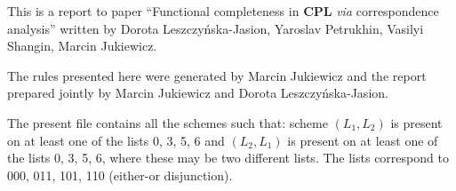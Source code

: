 \documentclass[11pt]{article}
\begin{document}
	
	This is a report to paper ``Functional completeness in \textbf{CPL} \textit{via} correspondence analysis'' written by Dorota Leszczy\'{n}ska-Jasion, 
	Yaroslav Petrukhin, Vasilyi Shangin, Marcin Jukiewicz. 
	
	The rules presented here were generated by Marcin Jukiewicz and the report prepared jointly by Marcin Jukiewicz and Dorota Leszczy\'{n}ska-Jasion.
	
	The present file contains all the schemes such that: scheme $(L_1, L_2)$ is present on at least one of the lists 0, 3, 5, 6 and $(L_2, L_1)$ is present on at least one of the lists 0, 3, 5, 6, where these may be two different lists. The lists correspond to 000, 011, 101, 110 (either-or disjunction).
	
	\bigskip
	
\begin{center}


\end{center}
\end{document}
